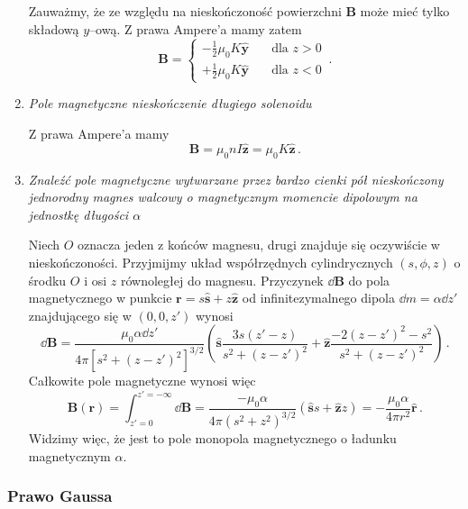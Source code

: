 \documentclass[../main.tex]{subfiles}
\begin{document}
\begin{enumerate}
    Zauważmy, że ze względu na nieskończoność powierzchni \(\mathbf{B}\) może mieć tylko składową
    \(y\)--ową. Z prawa Ampere'a mamy zatem
    \begin{equation*}
        \mathbf{B}=\begin{cases} -\frac{1}{2}\mu_0K\mathbf{\hat{y}}&\quad\text{dla \(z>0\)}\\+\frac{1}{2}\mu_0K\mathbf{\hat{y}}&\quad\text{dla \(z<0\)}\end{cases}\,.
    \end{equation*}
    
    \item \textit{Pole magnetyczne nieskończenie długiego solenoidu}
    \medskip
    
    Z prawa Ampere'a mamy
    \begin{equation*}
        \mathbf{B}=\mu_0nI\mathbf{\hat{z}}=\mu_0K\mathbf{\hat{z}}\,.
    \end{equation*}
    
    \item\textit{Znaleźć pole magnetyczne wytwarzane przez bardzo cienki pół nieskończony jednorodny
    magnes walcowy o magnetycznym momencie dipolowym na jednostkę długości \(\alpha\) }
    \medskip
    
    Niech \(O\) oznacza jeden z końców magnesu, drugi znajduje się oczywiście w nieskończoności.
    Przyjmijmy układ współrzędnych cylindrycznych \((s,\phi,z)\) o środku \(O\) i osi \(z\)
    równoległej do magnesu. Przyczynek \(\dd{\mathbf{B}}\) do pola magnetycznego w punkcie
    \(\mathbf{r}=s\mathbf{\hat{s}}+z\mathbf{\hat{z}}\) od infinitezymalnego dipola
    \(\dd{m}=\alpha\dd{z'}\) znajdującego się w \((0,0,z')\) wynosi
    \begin{equation*}
        \dd{\mathbf{B}}=\frac{\mu_0\alpha\dd{z'}}{4\pi[s^2+(z-z')^2]^{3/2}}\left(\mathbf{\hat{s}}\frac{3s(z'-z)}{s^2+(z-z')^2}+\mathbf{\hat{z}}\frac{-2(z-z')^2-s^2}{s^2+(z-z')^2}\right)\,.
    \end{equation*}
    Całkowite pole magnetyczne wynosi więc
    \begin{equation*}
        \mathbf{B}(\mathbf{r})=\int_{z'=0}^{z'=-\infty}\dd{\mathbf{B}}=\frac{-\mu_0\alpha}{4\pi(s^2+z^2)^{3/2}}(\mathbf{\hat{s}}s+\mathbf{\hat{z}}z)=-\frac{\mu_0\alpha}{4\pi r^2}\mathbf{\hat{r}}\,.
    \end{equation*}
    Widzimy więc, że jest to pole monopola magnetycznego o ładunku magnetycznym \(\alpha\).
\end{enumerate}
\subsubsection{Prawo Gaussa}
\noindent{}\\
\end{document}
